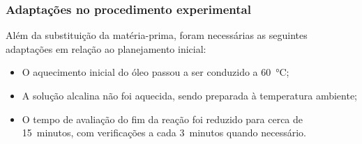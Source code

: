 \subsubsection{Adaptações no procedimento experimental}

Além da substituição da matéria-prima, foram necessárias as seguintes adaptações em relação ao planejamento inicial:

\begin{itemize}
    \item O aquecimento inicial do óleo passou a ser conduzido a 60~°C;
    \item A solução alcalina não foi aquecida, sendo preparada à temperatura ambiente;
    \item O tempo de avaliação do fim da reação foi reduzido para cerca de 15~minutos, com verificações a cada 3~minutos quando necessário.
\end{itemize}